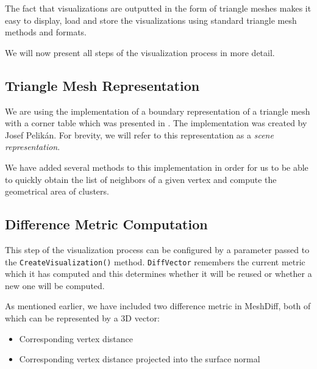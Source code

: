 The fact that visualizations are outputted in the form of triangle meshes makes it easy to display, load and store the visualizations using standard triangle mesh methods and formats.

We will now present all steps of the visualization process in more detail.

\subsection{Triangle Mesh Representation}

We are using the implementation of a boundary representation of a triangle mesh with a corner table which was presented in \citet{Corner03}. The implementation was created by Josef Pelikán. For brevity, we will refer to this representation as a {\it scene representation}\footnotemark.


We have added several methods to this implementation in order for us to be able to quickly obtain the list of neighbors of a given vertex and compute the geometrical area of clusters.

\subsection{Difference Metric Computation}
\label{sec:analysis_metric}

This step of the visualization process can be configured by a parameter passed to the \verb+CreateVisualization()+ method. \verb+DiffVector+ remembers the current metric which it has computed and this determines whether it will be reused or whether a new one will be computed.

As mentioned earlier, we have included two difference metric in MeshDiff, both of which can be represented by a 3D vector:

\begin{itemize}
\item Corresponding vertex distance
\item Corresponding vertex distance projected into the surface normal
\end{itemize}

